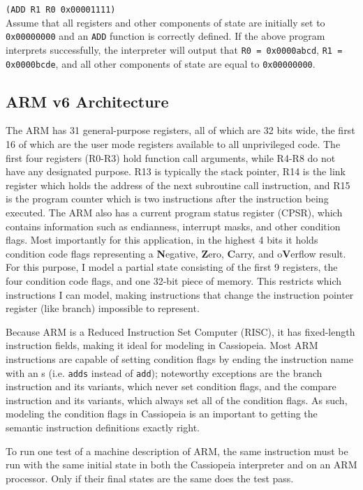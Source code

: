 \documentclass[letterpaper,12pt]{article}
\begin{document}
\texttt{(ADD R1 R0 0x00001111)}\\

Assume that all registers and other components of state are initially set to \texttt{0x00000000} and an \texttt{ADD} function is correctly defined. If the above program interprets successfully, the interpreter will output that \texttt{R0 = 0x0000abcd}, \texttt{R1 = 0x0000bcde}, and all other components of state are equal to \texttt{0x00000000}.

\subsection{ARM v6 Architecture}

The ARM has 31 general-purpose registers, all of which are 32 bits wide, the first 16 of which are the user mode registers available to all unprivileged code. The first four registers (R0-R3) hold function call arguments, while R4-R8 do not have any designated purpose. R13 is typically the stack pointer, R14 is the link register which holds the address of the next subroutine call instruction, and R15 is the program counter which is two instructions after the instruction being executed. The ARM also has a current program status register (CPSR), which contains information such as endianness, interrupt masks, and other condition flags. Most importantly for this application, in the highest 4 bits it holds condition code flags representing a \textbf{N}egative, \textbf{Z}ero, \textbf{C}arry, and o\textbf{V}erflow result\cite{ARM}. For this purpose, I model a partial state consisting of the first 9 registers, the four condition code flags, and one 32-bit piece of memory. This restricts which instructions I can model, making instructions that change the instruction pointer register (like branch) impossible to represent.

Because ARM is a Reduced Instruction Set Computer (RISC)\cite{ARM}, it has fixed-length instruction fields, making it ideal for modeling in Cassiopeia. Most ARM instructions are capable of setting condition flags by ending the instruction name with an s (i.e. \texttt{adds} instead of \texttt{add}); noteworthy exceptions are the branch instruction and its variants, which never set condition flags, and the compare instruction and its variants, which always set all of the condition flags. As such, modeling the condition flags in Cassiopeia is an important to getting the semantic instruction definitions exactly right.

To run one test of a machine description of ARM, the same instruction must be run with the same initial state in both the Cassiopeia interpreter and on an ARM processor. Only if their final states are the same does the test pass.
\end{document}
